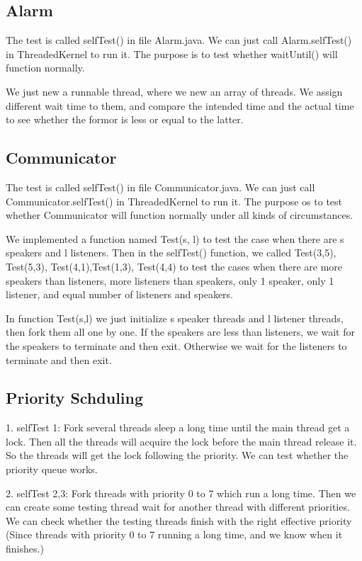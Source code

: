 \documentclass[a4paper,10pt]{article}
\begin{document}
\subsection{Alarm}

The test is called selfTest() in file Alarm.java. We can just call Alarm.selfTest() in ThreadedKernel to run it. The purpose is to test whether waitUntil() will function normally.

We just new a runnable thread, where we new an array of threads. We assign different wait time to them, and compare the intended time and the actual time to see whether the formor is less or equal to the latter.

\subsection{Communicator}

The test is called selfTest() in file Communicator.java. We can just call Communicator.selfTest() in ThreadedKernel to run it. The purpose os to test whether Communicator will function normally under all kinds of circumstances.

We implemented a function named Test(s, l) to test the case when there are s speakers and l listeners. Then in the selfTest() function, we called Test(3,5), Test(5,3), Test(4,1),Test(1,3), Test(4,4) to test the cases when there are more speakers than listeners, more listeners than speakers, only 1 speaker, only 1 listener, and equal number of listeners and speakers.

In function Test(s,l) we just initialize s speaker threads and l listener threads, then fork them all one by one. If the speakers are less than listeners, we wait for the speakers to terminate and then exit. Otherwise we wait for the listeners to terminate and then exit.
\subsection{Priority Schduling}

1.  selfTest 1: Fork several threads sleep a long time until the main thread get a lock. Then all the threads will acquire the lock before the main thread release it. So the threads will get the lock following the priority. We can test whether the priority queue works.

2. selfTest 2,3: Fork threads with priority 0 to 7 which run a long time. Then we can create some testing thread wait for another thread with different priorities. We can check whether the testing threads finish with the right effective priority (Since threads with priority 0 to 7 running a long time, and we know when it finishes.)
\end{document}
